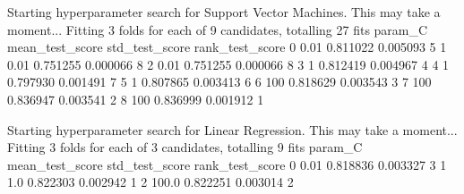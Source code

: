 Starting hyperparameter search for Support Vector Machines. This may take a moment...
Fitting 3 folds for each of 9 candidates, totalling 27 fits
  param_C  mean_test_score  std_test_score  rank_test_score
0    0.01         0.811022        0.005093                5
1    0.01         0.751255        0.000066                8
2    0.01         0.751255        0.000066                8
3       1         0.812419        0.004967                4
4       1         0.797930        0.001491                7
5       1         0.807865        0.003413                6
6     100         0.818629        0.003543                3
7     100         0.836947        0.003541                2
8     100         0.836999        0.001912                1


Starting hyperparameter search for Linear Regression. This may take a moment...
Fitting 3 folds for each of 3 candidates, totalling 9 fits
  param_C  mean_test_score  std_test_score  rank_test_score
0    0.01         0.818836        0.003327                3
1     1.0         0.822303        0.002942                1
2   100.0         0.822251        0.003014                2


